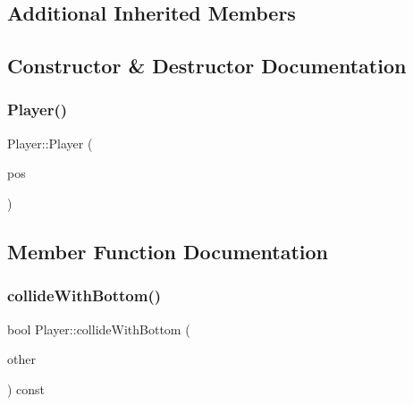 \subsection*{Additional Inherited Members}


\subsection{Constructor \& Destructor Documentation}
\mbox{\label{class_player_a764ad06a52c68d38a95f61a731369c86}} 
\subsubsection{\texorpdfstring{Player()}{Player()}}
{\footnotesize\ttfamily Player\+::\+Player (\begin{DoxyParamCaption}\item[{\hyperlink{class_vector3}{Vector3}}]{pos }\end{DoxyParamCaption})\hspace{0.3cm}{\ttfamily [inline]}}



\subsection{Member Function Documentation}
\mbox{\label{class_player_a476948950b48fde97113707c1b6e6195}} 
\subsubsection{\texorpdfstring{collide\+With\+Bottom()}{collideWithBottom()}}
{\footnotesize\ttfamily bool Player\+::collide\+With\+Bottom (\begin{DoxyParamCaption}\item[{const \hyperlink{class_game_object}{Game\+Object} $\ast$}]{other }\end{DoxyParamCaption}) const\hspace{0.3cm}{\ttfamily [inline]}}

\mbox{\label{class_player_a1fb512423a77eee4ed0dea7cb7179c83}} 
